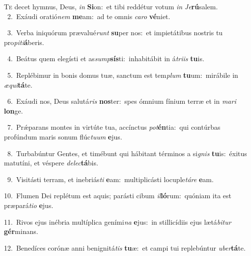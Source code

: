 \lettrine{\initial\textcolor{\initialcolor}{T}}{e} decet hymnus, Deus, \textit{in} \textbf{Si}\-on:~\star et tibi reddétur votum \textit{in} \textit{Je}\-\textbf{rú}salem.\\
{\numbfont\textcolor{\numbcolor}{~2.}}~Exáudi oratió\textit{nem} \textbf{me}\-am:~\star ad te omnis \textit{ca}\-\textit{ro} \textbf{vé}\-niet.\par
{\numbfont\textcolor{\numbcolor}{~3.}}~Verba iniquórum prævalué\textit{runt} \textbf{su}\-per nos:~\star et impietátibus nostris tu pro\-\textit{pi}\-\textit{ti}\textbf{á}beris.\par
{\numbfont\textcolor{\numbcolor}{~4.}}~Beátus quem elegísti et as\-\textit{sump}\-\textbf{sís}ti:~\star inhabitábit in á\-\textit{tri}\-\textit{is} \textbf{tu}\-is.\par
{\numbfont\textcolor{\numbcolor}{~5.}}~Replébimur in bonis domus tuæ, sanctum est tem\textit{plum} \textbf{tu}\-um:~\star mirábile in \textit{æ}\-\textit{qui}\textbf{tá}te.\par
{\numbfont\textcolor{\numbcolor}{~6.}}~Exáudi nos, Deus salutá\textit{ris} \textbf{nos}\-ter:~\star spes ómnium fínium terræ et in \textit{ma}\-\textit{ri} \textbf{lon}\-ge.\par
{\numbfont\textcolor{\numbcolor}{~7.}}~Prǽparans montes in virtúte tua, accínctus \textit{pot}\-\textbf{én}tia:~\star qui contúrbas profúndum maris sonum flúc\-\textit{tu}\-\textit{um} \textbf{e}\-jus.\par
{\numbfont\textcolor{\numbcolor}{~8.}}~Turbabúntur Gentes, et timébunt qui hábitant términos a si\textit{gnis} \textbf{tu}\-is:~\star éxitus matutíni, et véspere \textit{de}\-\textit{lec}\textbf{tá}bis.\par
{\numbfont\textcolor{\numbcolor}{~9.}}~Visitásti terram, et inebriás\textit{ti} \textbf{e}\-am:~\star multiplicásti locuple\-\textit{tá}\-\textit{re} \textbf{e}\-am.\par
{\numbfont\textcolor{\numbcolor}{10.}}~Flumen Dei replétum est aquis; parásti cibum \textit{il}\-\textbf{ló}rum:~\star quóniam ita est præpará\-\textit{ti}\-\textit{o} \textbf{e}\-jus.\par
{\numbfont\textcolor{\numbcolor}{11.}}~Rivos ejus inébria multíplica geními\textit{na} \textbf{e}\-jus:~\star in stillicídiis ejus lætá\-\textit{bi}\-\textit{tur} \textbf{gér}\-minans.\par
{\numbfont\textcolor{\numbcolor}{12.}}~Benedíces corónæ anni benignitá\textit{tis} \textbf{tu}\-æ:~\star et campi tui replebúntur \textit{u}\-\textit{ber}\textbf{tá}te.\par
